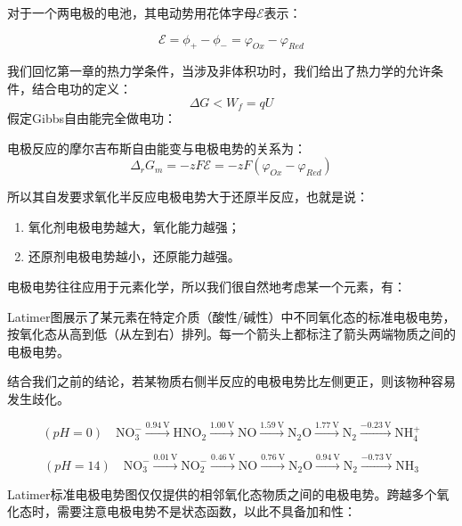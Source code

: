 对于一个两电极的电池，其电动势用花体字母$\mathcal{E}$表示：

\begin{proposition}[电动势]
$$\mathcal{E} = \phi_+ -\phi_- =\varphi_{Ox} - \varphi_{Red}  $$
\end{proposition}

我们回忆第一章的热力学条件，当涉及非体积功时，我们给出了热力学的允许条件，结合电功的定义：$$\Delta G < W_f = q U $$假定Gibbs自由能完全做电功：

\begin{proposition}[电极电势与Gibbs自由能的关系]
电极反应的摩尔吉布斯自由能变与电极电势的关系为：
$$\Delta_r G_m = -zF\mathcal{E} =- z F (\varphi_{Ox} - \varphi_{Red})$$

所以其自发要求氧化半反应电极电势大于还原半反应，也就是说：
\begin{enumerate}
  \item 氧化剂电极电势越大，氧化能力越强；
  \item 还原剂电极电势越小，还原能力越强。
\end{enumerate}
\end{proposition}

电极电势往往应用于元素化学，所以我们很自然地考虑某一个元素，有：

\begin{definition}
Latimer图展示了某元素在特定介质（酸性/碱性）中不同氧化态的标准电极电势，按氧化态从高到低（从左到右）排列。每一个箭头上都标注了箭头两端物质之间的电极电势。

结合我们之前的结论，若某物质右侧半反应的电极电势比左侧更正，则该物种容易发生歧化。
\end{definition}
\begin{example}[氮的Latimer标准电极电势图]
  $$
(pH = 0)\quad\text{NO}_3^- \xrightarrow{0.94\ \text{V}} 
\text{HNO}_2 \xrightarrow{1.00\ \text{V}} 
\text{NO} \xrightarrow{1.59\ \text{V}} 
\text{N}_2\text{O} \xrightarrow{1.77\ \text{V}} 
\text{N}_2 \xrightarrow{-0.23\ \text{V}} 
\text{NH}_4^+
$$


$$
(pH =14)\quad\text{NO}_3^- \xrightarrow{0.01\ \text{V}} 
\text{NO}_2^- \xrightarrow{0.46\ \text{V}} 
\text{NO} \xrightarrow{0.76\ \text{V}} 
\text{N}_2\text{O} \xrightarrow{0.94\ \text{V}} 
\text{N}_2 \xrightarrow{-0.73\ \text{V}} 
\text{NH}_3
$$

\end{example}

Latimer标准电极电势图仅仅提供的相邻氧化态物质之间的电极电势。跨越多个氧化态时，需要注意电极电势不是状态函数，以此不具备加和性：


